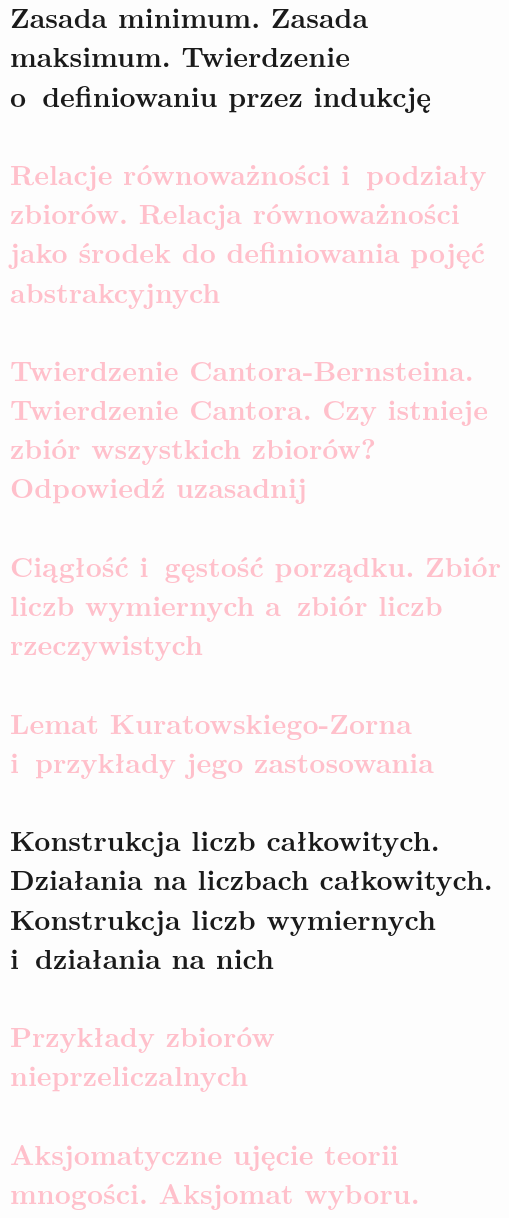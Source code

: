\section{Zasada minimum. Zasada maksimum. Twierdzenie o~definiowaniu przez indukcję}


\section{\textcolor{pink}{Relacje równoważności i~podziały zbiorów. Relacja równoważności jako środek do definiowania pojęć abstrakcyjnych}}


\section{\textcolor{pink}{Twierdzenie Cantora-Bernsteina. Twierdzenie Cantora. Czy istnieje zbiór wszystkich zbiorów? Odpowiedź uzasadnij}}


\section{\textcolor{pink}{Ciągłość i~gęstość porządku. Zbiór liczb wymiernych a~zbiór liczb rzeczywistych}}

\section{\textcolor{pink}{Lemat Kuratowskiego-Zorna i~przykłady jego zastosowania}}

\section{Konstrukcja liczb całkowitych. Działania na liczbach całkowitych. Konstrukcja liczb wymiernych i~działania na nich}


\section{\textcolor{pink}{Przykłady zbiorów nieprzeliczalnych}}

\section{\textcolor{pink}{Aksjomatyczne ujęcie teorii mnogości. Aksjomat wyboru.}}

